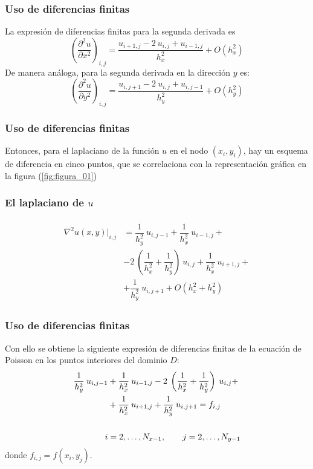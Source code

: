 \documentclass[12pt]{beamer}
\begin{document}
\begin{frame}
\frametitle{Uso de diferencias finitas}
La expresión de diferencias finitas para la segunda derivada es
\begin{equation}
\left( \dfrac{\partial^{2} u}{\partial x^{2}} \right)_{i,j} = \dfrac{u_{i+1, j} - 2 \: u_{i, j} + u_{i-1,j}}{h_{x}^{2}} + O(h_{x}^{2})
\label{eq:ecuacion_13_03}
\end{equation}
\pause
De manera análoga, para la segunda derivada en la dirección $y$ es:
\begin{equation}
\left( \dfrac{\partial^{2} u}{\partial y^{2}} \right)_{i,j} = \dfrac{u_{i, j+1} - 2 \: u_{i, j} + u_{i, j-1}}{h_{y}^{2}} + O(h_{y}^{2})
\label{eq:ecuacion_13_04}
\end{equation}
\end{frame}
\begin{frame}
\frametitle{Uso de diferencias finitas}
Entonces, para el laplaciano de la función $u$ en el nodo $(x_{i}, y_{i})$, hay un esquema de diferencia en cinco puntos, que se correlaciona con la representación gráfica en la figura (\ref{fig:figura_01})
\end{frame}
\begin{frame}
\frametitle{El laplaciano de $u$}
\begin{align}
\begin{aligned}
\nabla^{2} u(x,y) \vert_{i,j} &= \dfrac{1}{h_{y}^{2}} \: u_{i, j-1} + \dfrac{1}{h_{x}^{2}} \: u_{i-1, j} + \\
&- 2 \: \left( \dfrac{1}{h_{x}^{2}} + \dfrac{1}{h_{y}^{2}} \right) \: u_{i, j}  + \dfrac{1}{h_{x}^{2}} \: u_{i+1, j}  + \\
&+ \dfrac{1}{h_{y}^{2}} \: u_{i, j+1} + O(h_{x}^{2} + h_{y}^{2})
\end{aligned}
\label{eq:ecuacion_13_05}
\end{align}
\end{frame}
\begin{frame}
\frametitle{Uso de diferencias finitas}
Con ello se obtiene la siguiente expresión de diferencias finitas de la ecuación de Poisson en los puntos interiores del dominio $D$:
\begin{align}
\begin{aligned}
\dfrac{1}{h_{y}^{2}} \: u_{i, j-1} &+ \dfrac{1}{h_{x}^{2}} \: u_{i-1, j} - 2 \: \left( \dfrac{1}{h_{x}^{2}} + \dfrac{1}{h_{y}^{2}} \right) \: u_{i, j} + \\
&+ \dfrac{1}{h_{x}^{2}} \: u_{i+1, j} + \dfrac{1}{h_{y}^{2}} \: u_{i, j+1} = f_{i, j} \\
\\
i &= 2, \ldots, N_{x-1}, \hspace{0.7cm} j = 2, \ldots, N_{y-1}
\end{aligned}
\label{eq:ecuacion_13_06}
\end{align}
donde $f_{i, j} = f(x_{i}, y_{j})$.
\end{frame}
\end{document}
